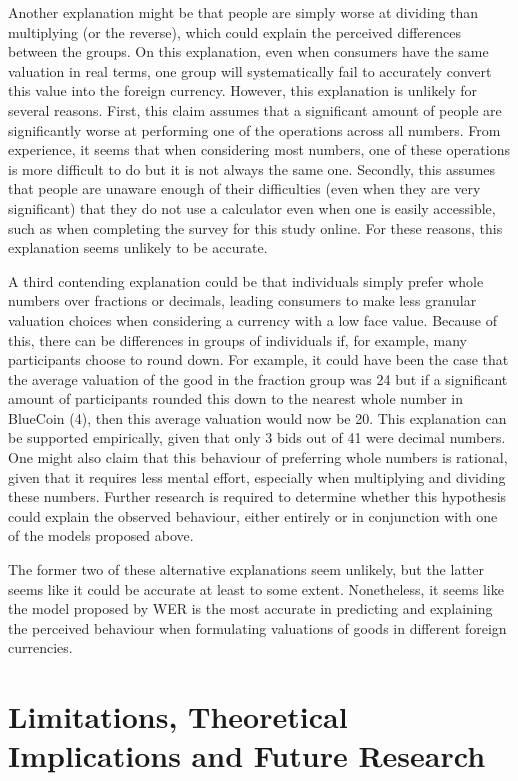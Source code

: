 \documentclass[
]{report}
\begin{document}
Another explanation might be that people are simply worse at dividing
than multiplying (or the reverse), which could explain the perceived
differences between the groups. On this explanation, even when consumers
have the same valuation in real terms, one group will systematically
fail to accurately convert this value into the foreign currency.
However, this explanation is unlikely for several reasons. First, this
claim assumes that a significant amount of people are significantly
worse at performing one of the operations across all numbers. From
experience, it seems that when considering most numbers, one of these
operations is more difficult to do but it is not always the same one.
Secondly, this assumes that people are unaware enough of their
difficulties (even when they are very significant) that they do not use
a calculator even when one is easily accessible, such as when completing
the survey for this study online. For these reasons, this explanation
seems unlikely to be accurate.

A third contending explanation could be that individuals simply prefer
whole numbers over fractions or decimals, leading consumers to make less
granular valuation choices when considering a currency with a low face
value. Because of this, there can be differences in groups of
individuals if, for example, many participants choose to round down. For
example, it could have been the case that the average valuation of the
good in the fraction group was 24 but if a significant amount of
participants rounded this down to the nearest whole number in BlueCoin
(4), then this average valuation would now be 20. This explanation can
be supported empirically, given that only 3 bids out of 41 were decimal
numbers. One might also claim that this behaviour of preferring whole
numbers is rational, given that it requires less mental effort,
especially when multiplying and dividing these numbers. Further research
is required to determine whether this hypothesis could explain the
observed behaviour, either entirely or in conjunction with one of the
models proposed above.

The former two of these alternative explanations seem unlikely, but the
latter seems like it could be accurate at least to some extent.
Nonetheless, it seems like the model proposed by WER is the most
accurate in predicting and explaining the perceived behaviour when
formulating valuations of goods in different foreign currencies.

\section{Limitations, Theoretical Implications and Future
Research}\label{limitations-theoretical-implications-and-future-research}
\end{document}

